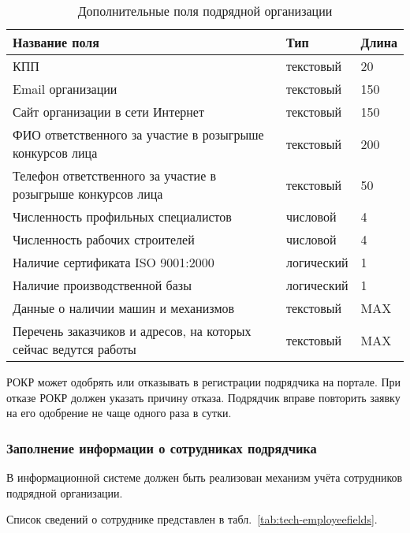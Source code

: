 \begin{footnotesize}
\begin{longtable}[h]{|p{}|p{}|p{}|}
	\caption{\label{tab:tech-orgaddfields}Дополнительные поля подрядной организации} \\
	\hline
		\textbf{Название поля} & \textbf{Тип} & \textbf{Длина} \\
	\hline \endhead
		КПП & текстовый & 20 \\
	\hline
		Email организации & текстовый & 150 \\
	\hline
		Сайт организации в сети Интернет & текстовый & 150 \\
	\hline
		ФИО ответственного за участие в розыгрыше конкурсов лица & текстовый & 200 \\
	\hline
		Телефон ответственного за участие в розыгрыше конкурсов лица & текстовый & 50 \\
	\hline
		Численность профильных специалистов & числовой & 4 \\
	\hline
		Численность рабочих строителей & числовой & 4 \\
	\hline
		Наличие сертификата ISO 9001:2000 & логический & 1 \\
	\hline
		Наличие производственной базы & логический & 1 \\
	\hline
		Данные о наличии машин и механизмов & текстовый & MAX \\
	\hline
		Перечень заказчиков и адресов, на которых сейчас ведутся работы & текстовый & MAX \\
	\hline
\end{longtable}
\end{footnotesize}

РОКР может одобрять или отказывать в регистрации подрядчика на портале.
При отказе РОКР должен указать причину отказа.
Подрядчик вправе повторить заявку на его одобрение не чаще одного раза в сутки.

\subsubsection{Заполнение информации о сотрудниках подрядчика}

В информационной системе должен быть реализован механизм учёта сотрудников подрядной организации.

Список сведений о сотруднике представлен в табл.~\ref{tab:tech-employeefields}.


